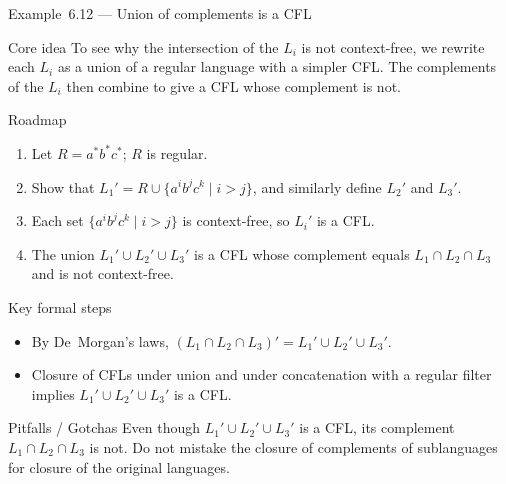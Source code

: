 \begin{frame}[t]{Example 6.12 — Union of complements is a CFL}
  \begin{tblock}{Core idea}
    To see why the intersection of the $L_i$ is not context‑free, we
    rewrite each $L_i$ as a union of a regular language with a simpler
    CFL.  The complements of the $L_i$ then combine to give a CFL
    whose complement is not.
  \end{tblock}
  \begin{tblock}{Roadmap}
    \begin{enumerate}
      \item Let $R = a^* b^* c^*$; $R$ is regular.
      \item Show that $L_1' = R \cup \{a^i b^j c^k \mid i>j\}$, and
        similarly define $L_2'$ and $L_3'$.
      \item Each set $\{a^i b^j c^k \mid i>j\}$ is context‑free, so
        $L_i'$ is a CFL.
      \item The union $L_1' \cup L_2' \cup L_3'$ is a CFL whose
        complement equals $L_1 \cap L_2 \cap L_3$ and is not context‑free.
    \end{enumerate}
  \end{tblock}
  \begin{tblock}{Key formal steps}
    \begin{itemize}
      \item By De Morgan’s laws, $(L_1 \cap L_2 \cap L_3)' = L_1' \cup
        L_2' \cup L_3'$.
      \item Closure of CFLs under union and under concatenation with a
        regular filter implies $L_1' \cup L_2' \cup L_3'$ is a CFL.
    \end{itemize}
  \end{tblock}
  \begin{talert}{Pitfalls / Gotchas}
    Even though $L_1' \cup L_2' \cup L_3'$ is a CFL, its complement
    $L_1 \cap L_2 \cap L_3$ is not.  Do not mistake the closure of
    complements of sublanguages for closure of the original languages.
  \end{talert}
  \label{fr:6.2-09}
\end{frame}


